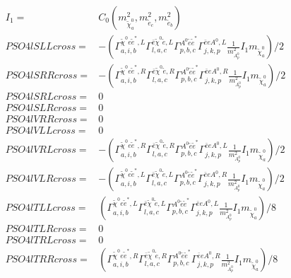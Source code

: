 \documentclass[A4,landscape]{article}
\begin{document}
\begin{align} 
I_1= & C_0(m^2_{\tilde{\chi}^0_{{a}}}, m^2_{\tilde{e}_{{c}}}, m^2_{\tilde{e}_{{b}}}) \\ 
  PSO4lSLLcross= & -( \Gamma^{\tilde{\chi}^0 e \tilde{e}^*,L}_{a, i, b} \Gamma^{\bar{e}\tilde{\chi}^0 \tilde{e} ,L}_{l, a, c} \Gamma^{A^0 \tilde{e} \tilde{e}^*}_{p, b, c} \Gamma^{\bar{e}e A^0 ,L}_{j, k, p} \frac{1}{m^2_{A^0_{{p}}}} I_1 m_{\tilde{\chi}^0_{{a}}})/2 \\ 
  PSO4lSRRcross= & -( \Gamma^{\tilde{\chi}^0 e \tilde{e}^*,R}_{a, i, b} \Gamma^{\bar{e}\tilde{\chi}^0 \tilde{e} ,R}_{l, a, c} \Gamma^{A^0 \tilde{e} \tilde{e}^*}_{p, b, c} \Gamma^{\bar{e}e A^0 ,R}_{j, k, p} \frac{1}{m^2_{A^0_{{p}}}} I_1 m_{\tilde{\chi}^0_{{a}}})/2 \\ 
  PSO4lSRLcross= & 0 \\ 
  PSO4lSLRcross= & 0 \\ 
  PSO4lVRRcross= & 0 \\ 
  PSO4lVLLcross= & 0 \\ 
  PSO4lVRLcross= & -( \Gamma^{\tilde{\chi}^0 e \tilde{e}^*,R}_{a, i, b} \Gamma^{\bar{e}\tilde{\chi}^0 \tilde{e} ,R}_{l, a, c} \Gamma^{A^0 \tilde{e} \tilde{e}^*}_{p, b, c} \Gamma^{\bar{e}e A^0 ,L}_{j, k, p} \frac{1}{m^2_{A^0_{{p}}}} I_1 m_{\tilde{\chi}^0_{{a}}})/2 \\ 
  PSO4lVLRcross= & -( \Gamma^{\tilde{\chi}^0 e \tilde{e}^*,L}_{a, i, b} \Gamma^{\bar{e}\tilde{\chi}^0 \tilde{e} ,L}_{l, a, c} \Gamma^{A^0 \tilde{e} \tilde{e}^*}_{p, b, c} \Gamma^{\bar{e}e A^0 ,R}_{j, k, p} \frac{1}{m^2_{A^0_{{p}}}} I_1 m_{\tilde{\chi}^0_{{a}}})/2 \\ 
  PSO4lTLLcross= & ( \Gamma^{\tilde{\chi}^0 e \tilde{e}^*,L}_{a, i, b} \Gamma^{\bar{e}\tilde{\chi}^0 \tilde{e} ,L}_{l, a, c} \Gamma^{A^0 \tilde{e} \tilde{e}^*}_{p, b, c} \Gamma^{\bar{e}e A^0 ,L}_{j, k, p} \frac{1}{m^2_{A^0_{{p}}}} I_1 m_{\tilde{\chi}^0_{{a}}})/8 \\ 
  PSO4lTLRcross= & 0 \\ 
  PSO4lTRLcross= & 0 \\ 
  PSO4lTRRcross= & ( \Gamma^{\tilde{\chi}^0 e \tilde{e}^*,R}_{a, i, b} \Gamma^{\bar{e}\tilde{\chi}^0 \tilde{e} ,R}_{l, a, c} \Gamma^{A^0 \tilde{e} \tilde{e}^*}_{p, b, c} \Gamma^{\bar{e}e A^0 ,R}_{j, k, p} \frac{1}{m^2_{A^0_{{p}}}} I_1 m_{\tilde{\chi}^0_{{a}}})/8 \\ 
\end{align} 
\end{document}
